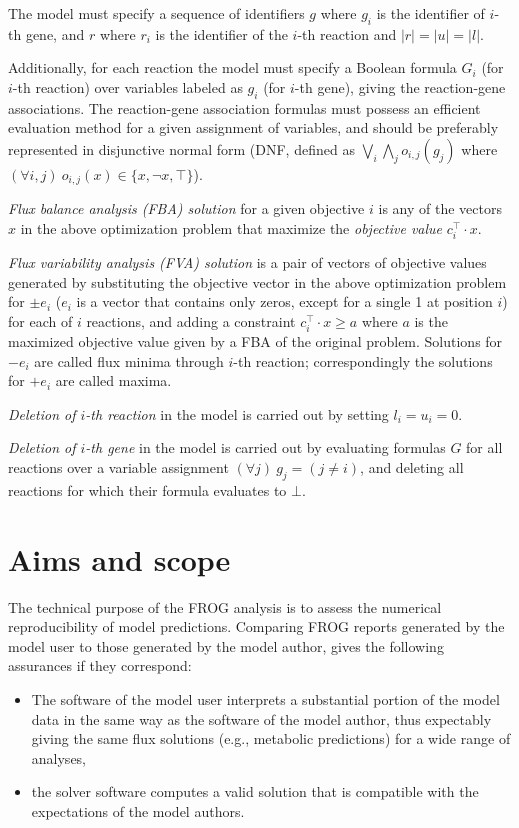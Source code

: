 The model must specify a sequence of identifiers $g$ where $g_i$ is the identifier of $i$-th gene, and $r$ where $r_i$ is the identifier of the $i$-th reaction and $|r| = |u| = |l|$.

Additionally, for each reaction the model must specify a Boolean formula $G_i$ (for $i$-th reaction) over variables labeled as $g_i$ (for $i$-th gene), giving the reaction-gene associations. The reaction-gene association formulas must possess an efficient evaluation method for a given assignment of variables, and should be preferably represented in disjunctive normal form (DNF, defined as $\bigvee_i\bigwedge_j o_{i,j}(g_j)$ where $(\forall i,j)\ o_{i,j}(x) \in \{x, \neg x, \top\}$).

\emph{Flux balance analysis (FBA) solution} for a given objective $i$ is any of the vectors $x$ in the above optimization problem that maximize the \emph{objective value} $c_i^\intercal \cdot x$.

\emph{Flux variability analysis (FVA) solution} is a pair of vectors of objective values generated by substituting the objective vector in the above optimization problem for $\pm e_i$ ($e_i$ is a vector that contains only zeros, except for a single 1 at position $i$) for each of $i$ reactions, and adding a constraint $c_i^\intercal\cdot x \geq a$ where $a$ is the maximized objective value given by a FBA of the original problem. Solutions for $-e_i$ are called flux minima through $i$-th reaction; correspondingly the solutions for $+e_i$ are called maxima.

\emph{Deletion of $i$-th reaction} in the model is carried out by setting $l_i = u_i = 0$.

\emph{Deletion of $i$-th gene} in the model is carried out by evaluating formulas $G$ for all reactions over a variable assignment $(\forall j)\ g_j = (j \neq i)$, and deleting all reactions for which their formula evaluates to $\bot$.~\cite{palsson2015systems}


\section{Aims and scope}

The technical purpose of the FROG analysis is to assess the numerical reproducibility of model predictions. Comparing FROG reports generated by the model user to those generated by the model author, gives the following assurances if they correspond:
\begin{itemize}
\item The software of the model user interprets a substantial portion of the model data in the same way as the software of the model author, thus expectably giving the same flux solutions (e.g., metabolic predictions) for a wide range of analyses,
\item the solver software computes a valid solution that is compatible with the expectations of the model authors.
\end{itemize}

